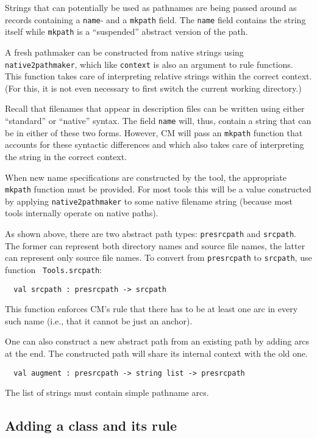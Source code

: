 Strings that can potentially be used as pathnames are being passed
around as records containing a {\tt name}- and a {\tt mkpath} field.
The {\tt name} field contains the string itself while {\tt mkpath}
is a ``suspended'' abstract version of the path.

A fresh pathmaker can be constructed from native strings using {\tt
native2pathmaker}, which like {\tt context} is also an argument to
rule functions.  This function takes care of interpreting relative
strings within the correct context.  (For this, it is not even
necessary to first switch the current working directory.)

Recall that filenames that appear in description files can be written
using either ``standard'' or ``native'' syntax.  The field {\tt name}
will, thus, contain a string that can be in either of these two forms.
However, CM will pass an {\tt mkpath} function that accounts for these
syntactic differences and which also takes care of interpreting the
string in the correct context.

When new name specifications are constructed by the tool, the
appropriate {\tt mkpath} function must be provided.  For most tools
this will be a value constructed by applying {\tt native2pathmaker} to
some native filename string (because most tools internally operate on
native paths).

As shown above, there are two abstract path types: {\tt presrcpath}
and {\tt srcpath}.  The former can represent both directory names and
source file names, the latter can represent only source file names.
To convert from {\tt presrcpath} to {\tt srcpath}, use function {\tt
Tools.srcpath}:
\begin{lstlisting}
  val srcpath : presrcpath -> srcpath
\end{lstlisting}%
This function enforces CM's rule that there has to be at least one arc
in every such name (i.e., that it cannot be just an anchor).

One can also construct a new abstract path from an existing path by
adding arcs at the end.  The constructed path will share its internal
context with the old one.

\begin{lstlisting}
  val augment : presrcpath -> string list -> presrcpath
\end{lstlisting}%

The list of strings must contain simple pathname arcs.

\subsection{Adding a class and its rule}

